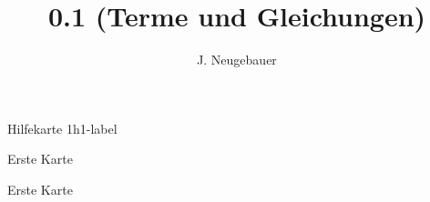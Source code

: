 \documentclass[12pt,a5paper,landscape]{scrartcl}
\author{J. Neugebauer}
\title{0.1 (Terme und Gleichungen)}
\date{\Heute}
\begin{document}
	\begin{hilfekarte}{Hilfekarte 1}{h1-label}

	\end{hilfekarte}


	\begin{karte1}{Erste Karte}

	\end{karte1}

	\begin{loesungskarte}{Erste Karte}

	\end{loesungskarte}
\end{document}
